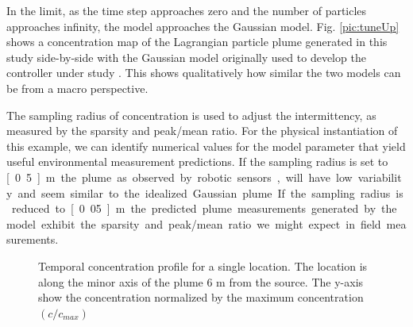\documentclass[ letterpaper, 10 pt, conference]{ieeeconf}  %
\begin{document}
In the limit, as the time step approaches zero and the number of particles approaches infinity, the model approaches the Gaussian model.   Fig. \ref{pic:tuneUp} shows a concentration map of the Lagrangian particle plume generated in this study side-by-side with the Gaussian model originally used to develop the controller under study \cite{Li2014}.  This shows qualitatively how similar the two models can be from a macro perspective.  


The sampling radius of concentration is used to adjust the intermittency, as measured by the sparsity and peak/mean ratio.  For the physical instantiation of this example, we can identify numerical values for the model parameter that yield useful environmental measurement predictions.  If the sampling radius is set to \unit[0.5]{m} the plume. as observed by robotic sensors, will have low variability and seem similar to the idealized Gaussian plume.  If the sampling radius is reduced to \unit[0.05]{m} the predicted plume measurements generated by the model exhibit the sparsity and peak/mean ratio we might expect in field measurements. 

\begin{figure}[thpb]
      \centering
      \caption{Temporal concentration profile for a single location.  The location is along the minor axis of the plume 6 m from the source.  The y-axis show the concentration normalized by the maximum concentration $(c/c_{max})$}
   \label{pic:overTime}
 \end{figure}
\end{document}
